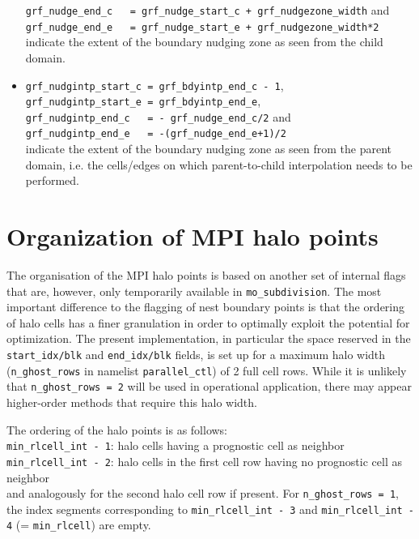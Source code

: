 \documentclass[11pt]{article}
\begin{document}
\begin{itemize}
\verb&grf_nudge_end_c   = grf_nudge_start_c + grf_nudgezone_width& and \\
\verb&grf_nudge_end_e   = grf_nudge_start_e + grf_nudgezone_width*2& \\
indicate the extent of the boundary nudging zone as seen from the child domain.
\item
\verb&grf_nudgintp_start_c = grf_bdyintp_end_c - 1&,\\
\verb&grf_nudgintp_start_e = grf_bdyintp_end_e&, \\
\verb&grf_nudgintp_end_c   = - grf_nudge_end_c/2& and \\
\verb&grf_nudgintp_end_e   = -(grf_nudge_end_e+1)/2& \\
indicate the extent of the boundary nudging zone as seen from the parent domain, i.e. the 
cells/edges on which parent-to-child interpolation needs to be performed.
\end{itemize}



\section{Organization of MPI halo points}

The organisation of the MPI halo points is based on another set of internal flags that are, however,
only temporarily available in \verb+mo_subdivision+. The most important difference to the flagging
of nest boundary points is that the ordering of halo cells has a finer granulation in order to
optimally exploit the potential for optimization. The present implementation, in particular the
space reserved in the \verb+start_idx/blk+ and \verb+end_idx/blk+ fields, is set up for a maximum
halo width (\verb+n_ghost_rows+ in namelist \verb+parallel_ctl+) of 2 full cell rows. While
it is unlikely that \verb+n_ghost_rows = 2+ will be used in operational application, there may
appear higher-order methods that require this halo width. 

The ordering of the halo points is as follows:\\
\verb+min_rlcell_int - 1+: halo cells having a prognostic cell as neighbor \\
\verb+min_rlcell_int - 2+: halo cells in the first cell row having no prognostic cell as neighbor \\
and analogously for the second halo cell row if present. For \verb+n_ghost_rows = 1+, the index segments
corresponding to \verb+min_rlcell_int - 3+ and \verb+min_rlcell_int - 4+ (= \verb+min_rlcell+) are empty.
\end{document}
